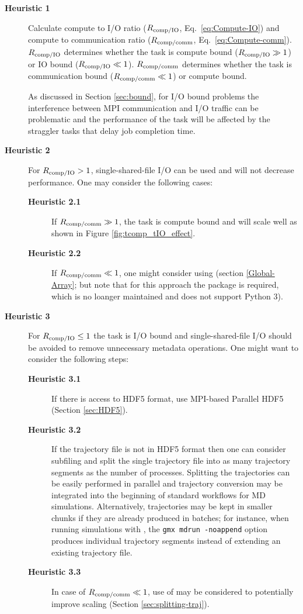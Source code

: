 \begin{description}
\item[\textbf{Heuristic 1}] Calculate compute to I/O ratio ($R_{\text{comp/IO}}$, Eq.~\ref{eq:Compute-IO}) and compute to communication ratio ($R_{\text{comp/comm}}$, Eq.~\ref{eq:Compute-comm}).
  $R_{\text{comp/IO}}$ determines whether the task is compute bound ($R_{\text{comp/IO}} \gg 1$) or IO bound ($R_{\text{comp/IO}} \ll 1$).
  $R_{\text{comp/comm}}$ determines whether the task is communication bound ($R_{\text{comp/comm}} \ll 1$) or compute bound.

  As discussed in Section \ref{sec:bound}, for I/O bound problems the interference between MPI communication and I/O traffic can be problematic \cite{VMD2013, Brown:2018ab} and the performance of the task will be affected by the straggler tasks that delay job completion time.
  
\item[\textbf{Heuristic 2}] For $R_{\text{comp/IO}} > 1$, single-shared-file I/O can be used and will not decrease performance. One may consider the following cases: 
  \begin{description}
  \item[\textbf{Heuristic 2.1}] If $R_{\text{comp/comm}} \gg 1$, the task is compute bound and will scale well as shown in Figure \ref{fig:tcomp_tIO_effect}. 
  \item[\textbf{Heuristic 2.2}] If $R_{\text{comp/comm}} \ll 1$, one might consider using  (section \ref{Global-Array}; but note that for this approach the  package is required, which is no loanger maintained and does not support Python 3).
  \end{description}
\item[\textbf{Heuristic 3}] For $R_{\text{comp/IO}} \le 1$ the task is I/O bound and single-shared-file I/O should be avoided to remove unnecessary metadata operations.
  One might want to consider the following steps:  
  \begin{description}
    \item[\textbf{Heuristic 3.1}] If there is access to HDF5 format, use MPI-based Parallel HDF5 (Section \ref{sec:HDF5}). 
    \item[\textbf{Heuristic 3.2}] If the trajectory file is not in HDF5 format then one can consider subfiling and split the single trajectory file into as many trajectory segments as the number of processes.
      Splitting the trajectories can be easily performed in parallel and trajectory conversion may be integrated into the beginning of standard workflows for MD simulations.
      Alternatively, trajectories may be kept in smaller chunks if they are already produced in batches; for instance, when running simulations with  \cite{Abraham:2015aa}, the \texttt{gmx mdrun -noappend} option produces individual trajectory segments instead of extending an existing trajectory file.
    \item[\textbf{Heuristic 3.3}] In case of $R_{\text{comp/comm}} \ll 1$, use of  may be considered to potentially improve scaling (Section \ref{sec:splitting-traj}).
  \end{description}
\end{description}

